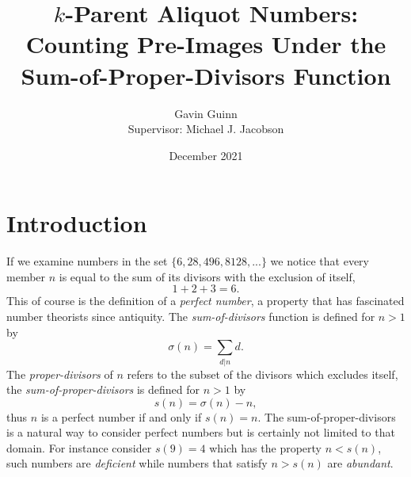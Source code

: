 \documentclass{article}
\title{$k$-Parent Aliquot Numbers: Counting Pre-Images Under the Sum-of-Proper-Divisors Function}
\author{Gavin Guinn\\{\small Supervisor: Michael J. Jacobson}}
\date{December 2021}
\theoremstyle{definition}
\begin{document}
\maketitle

\section{Introduction}
If we examine numbers in the set $\{6, 28, 496, 8128, ...\}$ we notice that every member $n$ is equal to the sum of its divisors  with the exclusion of itself,
$$1+2+3 = 6.$$
This of course is the definition of a \textit{perfect number}, a property that has fascinated number theorists since antiquity. The \textit{sum-of-divisors} function is defined for $n > 1$ by
$$\sigma(n) = \sum_{d|n} d.$$
The \textit{proper-divisors} of $n$ refers to the subset of the divisors which excludes itself, the \textit{sum-of-proper-divisors} is defined for $n > 1$ by
$$s(n) = \sigma(n) - n,$$
thus $n$ is a perfect number if and only if $s(n) = n$. The sum-of-proper-divisors is a natural way to consider perfect numbers but is certainly not limited to that domain. For instance consider $s(9) = 4$ which has the property $n < s(n)$, such numbers are \textit{deficient} while numbers that satisfy $n > s(n)$ are \textit{abundant}.
\end{document}

